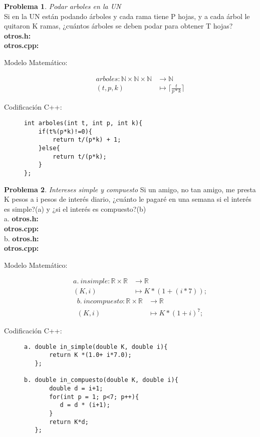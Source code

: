 \documentclass{article}
\theoremstyle{plain}
\theoremstyle{definition}
\newtheorem{problem}{Problema}
\begin{document}
\begin{problem} \emph{Podar arboles en la UN}\\
Si en la UN están podando árboles y cada rama tiene P hojas, y a cada árbol le quitaron K ramas, ¿cuántos árboles se deben podar para obtener T hojas?\\
\textbf{otros.h:}\ \\
\textbf{otros.cpp:}\ 
%
\begin{description}
\item[Modelo Matemático:]
%
\begin{align*}
arboles: \mathbb{N}\times\mathbb{N}\times\mathbb{N} &\to \mathbb{N}\\
(t,p,k) &\mapsto \lceil{\frac{t}{p*k}}\rceil{}
\end{align*}
%
\item[Codificación \textsf{C++}:]\hfill
%
\begin{verbatim}
int arboles(int t, int p, int k){
    if(t%(p*k)!=0){
        return t/(p*k) + 1;
    }else{
        return t/(p*k);
    }
};
\end{verbatim}
\end{description}
\end{problem}

\begin{problem} \emph{Intereses simple y compuesto}
Si un amigo, no tan amigo, me presta K pesos a i pesos de interés diario, ¿cuánto le pagaré en una semana si el interés es simple?(a) y ¿si el interés es compuesto?(b)\\
a. \textbf{otros.h:}\ \\
   \textbf{otros.cpp:}\ \\
b. \textbf{otros.h:}\ \\
   \textbf{otros.cpp:}\ 
%
\begin{description}
\item[Modelo Matemático:]
%
\begin{align*}
a.\ in simple: \mathbb{R}\times\mathbb{R} &\to \mathbb{R}\\
(K,i) &\mapsto K*(1+(i*7));
\end{align*}
\begin{align*}
b.\ in compuesto: \mathbb{R}\times\mathbb{R} &\to \mathbb{R}\\
(K,i) &\mapsto K*(1+i)^7;
\end{align*}
%
\item[Codificación \textsf{C++}:]\hfill
%
\begin{verbatim}
a. double in_simple(double K, double i){
       return K *(1.0+ i*7.0);
   };

b. double in_compuesto(double K, double i){
       double d = i+1;
       for(int p = 1; p<7; p++){
          d = d * (i+1);
       }
       return K*d;
   };
\end{verbatim}
\end{description}
\end{problem}
\end{document}
